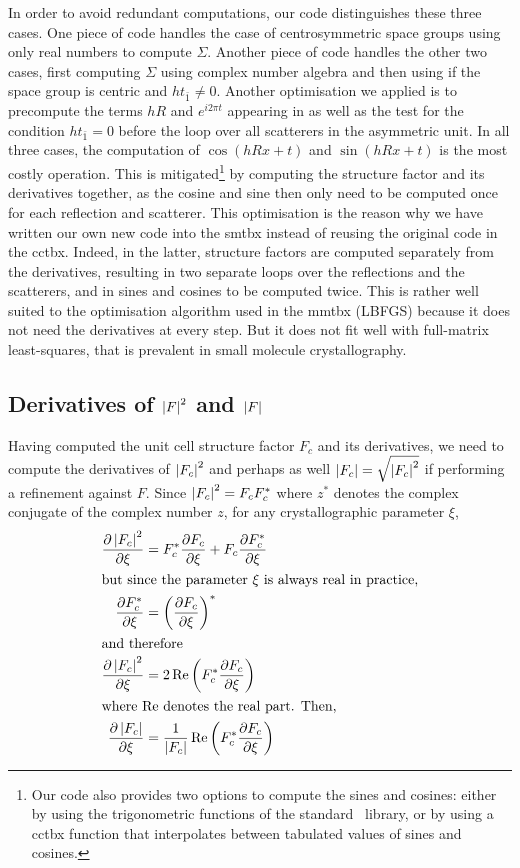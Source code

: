 \documentclass[pdf]{iucr}
\begin{document}
In order to avoid redundant computations, our code distinguishes these three cases. One piece of code handles the case of centrosymmetric space groups using only real numbers to compute $\Sigma$. Another piece of code handles the other two cases, first computing $\Sigma$ using complex number algebra and then using  if the space group is centric and $h t_{\bar{1}} \neq 0$. Another optimisation we applied is to precompute the terms $hR$ and $e^{i2\pi t}$ appearing in  as well as the test for the condition $h t_{\bar{1}}=0$ before the loop over all scatterers in the asymmetric unit. In all three cases, the computation of $\cos(hRx + t)$ and $\sin(hRx + t)$ is the most costly operation. This is mitigated\footnote{Our code also provides two options to compute the sines and cosines: either by using the trigonometric functions of the standard \cpp\ library, or by using a cctbx function that interpolates between tabulated values of sines and cosines.
} by computing the structure factor and its derivatives together, as the cosine and sine then only need to be computed once for each reflection and scatterer.
This optimisation is the reason why we have written our own new code into the smtbx instead of reusing the original code in the cctbx. Indeed, in the latter, structure factors are computed separately from the derivatives, resulting in two separate loops over the reflections and the scatterers, and in sines and cosines to be computed twice. This is rather well suited to the optimisation algorithm used in the mmtbx (LBFGS) because it does not need the derivatives at every step. But it does not fit well with full-matrix least-squares, that is prevalent in small molecule crystallography.  

\subsection{Derivatives of $\left| F \right|^2$ and $\left| F \right|$}

Having computed the unit cell structure factor $F_c$ and its derivatives, we need to compute the derivatives of $\left| F_c \right|^2$ and perhaps as well $\left| F_c \right| = \sqrt{\left| F_c \right|^2}$ if performing a refinement against $F$. Since $\left| F_c \right|^2 = F_c F_c^*$ where $z^*$ denotes the complex conjugate of the complex number $z$, for any crystallographic parameter $\xi$,
\begin{align}
\frac{\partial \left| F_c \right|^2}{\partial \xi} &= F_c^* \frac{\partial F_c}{\partial \xi} + F_c \frac{\partial F_c^*}{\partial \xi} \nonumber \\
\intertext{but since the parameter $\xi$ is always real in practice,}
\frac{\partial F_c^*}{\partial \xi} &= \left( \frac{\partial F_c}{\partial \xi} \right)^* \\
\intertext{and therefore}
\frac{\partial \left| F_c \right|^2}{\partial \xi} &= 2\operatorname{Re}\left( F_c^* \frac{\partial F_c}{\partial \xi}\right) \\
\intertext{where $\operatorname{Re}$ denotes the real part. Then,}
\frac{\partial \left| F_c \right|}{\partial \xi} &= \frac{1}{\left| F_c \right|} \operatorname{Re}\left( F_c^* \frac{\partial F_c}{\partial \xi}\right)
\end{align}
\end{document}
